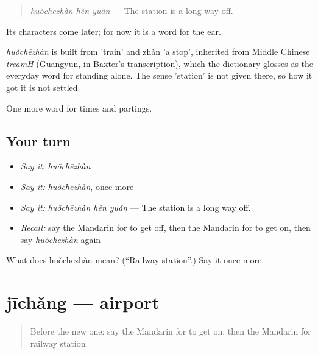 \begin{quote}
\emph{huǒchēzhàn hěn yuǎn} — The station is a long way off.
\end{quote}

Its characters come later; for now it is a word for the ear.

\begin{cousinweb}
\emph{huǒchēzhàn} is built from  'train' and zhàn 'a stop', inherited from Middle Chinese \emph{treamH} (Guangyun, in Baxter's transcription), which the dictionary glosses as the everyday word for standing alone. The sense 'station' is not given there, so how it got it is not settled.
\end{cousinweb}

\begin{grammarlens}[title={What you've built}]
One more word for times and partings.
\end{grammarlens}

\subsection*{Your turn}
\begin{itemize}
\raggedright
  \item \emph{Say it:} \emph{huǒchēzhàn}
  \item \emph{Say it:} \emph{huǒchēzhàn}, once more
  \item \emph{Say it:} \emph{huǒchēzhàn hěn yuǎn} — The station is a long way off.
  \item \emph{Recall:} say the Mandarin for to get off, then the Mandarin for to get on, then say \emph{huǒchēzhàn} again
\end{itemize}

\begin{tcolorbox}[breakable,colback=teal!4,colframe=teal!35!black,title={Before you move on}]
What does huǒchēzhàn mean? (\textquotedblleft{}Railway station\textquotedblright{}.) Say it once more.
\end{tcolorbox}
\section[jīchǎng]{jīchǎng — airport}

\label{lesson:ZH-C73-jichang}



\begin{quote}
Before the new one: say the Mandarin for to get on, then the Mandarin for railway station.
\end{quote}

